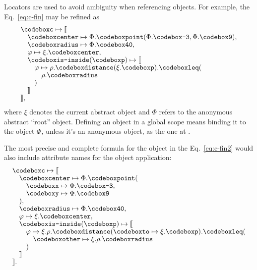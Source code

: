 Locators are used to avoid ambiguity when referencing objects.
For example, the Eq.~\ref{eq:c-fin} may be refined as
\begin{equation}
\begin{split}
& \f{c} \mapsto \llbracket \br
& \quad \f{center} \mapsto \Phi.\f{point}(\Phi.\f{-3}, \Phi.\f{9}), \br
& \quad \f{radius} \mapsto \Phi.\f{40}, \br
& \quad \varphi \mapsto \xi.\f{center}, \br
& \quad \f{is-inside}(\f{p}) \mapsto \llbracket \br
& \quad \quad \varphi \mapsto \rho.\f{distance}(\xi.\f{p}).\f{leq}( \br
& \quad \quad \quad \rho.\f{radius} \br
& \quad \quad ) \br
& \quad \rrbracket \br
& \rrbracket,
\end{split}
\end{equation}
where $\xi$ denotes the current abstract object
and $\Phi$ refers to the anonymous abstract ``root'' object.
Defining an object in a global scope
means binding it to the object $\Phi$, unless it's an anonymous
object, as the one at .

The most precise and complete formula for the object in the
Eq.~\ref{eq:c-fin2} would also include attribute names for
the object application:
\begin{equation}
\begin{split}
& \f{c} \mapsto \llbracket \br
& \quad \f{center} \mapsto \Phi.\f{point}( \br
& \quad \quad \f{x} \mapsto \Phi.\f{-3}, \br
& \quad \quad \f{y} \mapsto \Phi.\f{9} \br
& \quad ), \br
& \quad \f{radius} \mapsto \Phi.\f{40}, \br
& \quad \varphi \mapsto \xi.\f{center}, \br
& \quad \f{is-inside}(\f{p}) \mapsto \llbracket \br
& \quad \quad \varphi \mapsto \xi.\rho.\f{distance}(\f{to} \mapsto \xi.\f{p}).\f{leq}( \br
& \quad \quad \quad \f{other} \mapsto \xi.\rho.\f{radius} \br
& \quad \quad ) \br
& \quad \rrbracket \br
& \rrbracket.
\end{split}
\end{equation}



